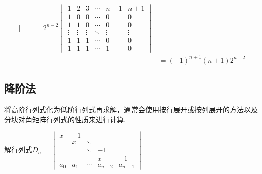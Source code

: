 \begin{solution}
\begin{align*}
\begin{vmatrix}
               \end{vmatrix}=2^{n-2}
        \begin{vmatrix}
            1      & 2      & 3      & \cdots & n-1    & n+1    \\
            1      & 0      & 0      & \cdots & 0      & 0      \\
            1      & 1      & 0      & \cdots & 0      & 0      \\
            \vdots & \vdots & \vdots & \ddots & \vdots & \vdots \\
            1      & 1      & 1      & \cdots & 0      & 0      \\
            1      & 1      & 1      & \cdots & 1      & 0
        \end{vmatrix}                      \\
            & =(-1)^{n+1}(n+1) 2^{n-2}
    \end{align*}
\end{solution}

\subsection{降阶法}

将高阶行列式化为低阶行列式再求解，通常会使用按行展开或按列展开的方法以及分块对角矩阵行列式的性质来进行计算.

\begin{example}{}{}
    解行列式$D_n=\begin{vmatrix}
            x     & -1    &        &         &         \\
                  & x     & \ddots &         &         \\
                  &       & \ddots & -1      &         \\
                  &       &        & x       & -1      \\
            a_{0} & a_{1} & \cdots & a_{n-2} & a_{n-1}
        \end{vmatrix}$
\end{example}

